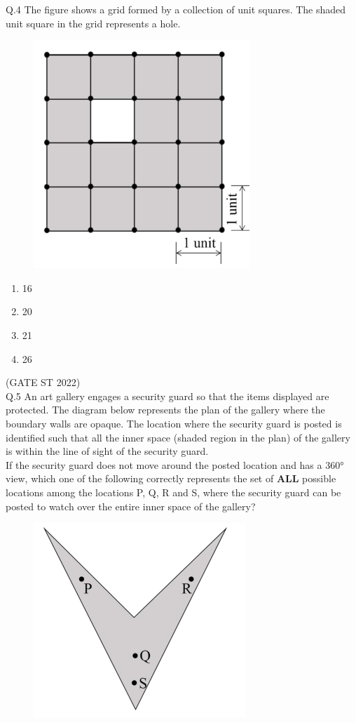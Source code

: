 \documentclass[journal,12pt,onecolumn]{IEEEtran}
\theoremstyle{remark}
\begin{document}
Q.4 The figure shows a grid formed by a collection of unit squares. The shaded unit square in the grid represents a hole.
	\begin{figure}[H]
		\centering
		\includegraphics[width=0.3\linewidth]{figs/screenshot001}
		\caption{}
		\label{fig:screenshot001}
	\end{figure}
	\begin{multicols}{4}
	\begin{enumerate}[label=(\Alph*)]
		\item 16
		\item 20
		\item 21
		\item 26
		
	\end{enumerate}
\end{multicols}
\hfill (GATE ST 2022)\\
	\vspace{2em}
Q.5 An art gallery engages a security guard so that the items displayed are protected. The diagram below represents the plan of the gallery where the boundary walls are opaque. The location where the security guard is posted is identified such that all the inner space (shaded region in the plan) of the gallery is within the line of sight of the security guard.\\
If the security guard does not move around the posted location and has a 360° view, which one of the following correctly represents the set of \textbf{ALL} possible locations among the locations P, Q, R and S, where the security guard can be posted to watch over the entire inner space of the gallery?\\
\begin{figure}[H]
		\centering
		\includegraphics[width=0.4\linewidth]{figs/screenshot002}
		\caption{}
		\label{fig:screenshot002}
\end{figure}
\end{document}
